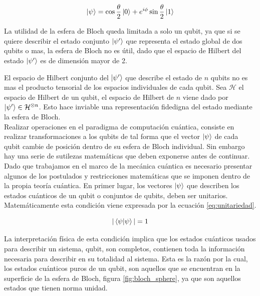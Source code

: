 \begin{equation}
    \ket{\psi} = \cos{\frac{\theta}{2}}\ket{0} + e^{i\phi}\sin{\frac{\theta}{2}}\ket{1}
    \label{eq:estado_bloch}
\end{equation}

La utilidad de la esfera de Bloch queda limitada a solo un qubit, ya que si se quiere describir el estado conjunto $\ket{\psi'}$ que representa el estado global de dos qubits o mas, la esfera de Bloch no es útil, dado que el espacio de Hilbert del estado $\ket{\psi'}$ es de dimensión mayor de 2. 

\newpage

El espacio de Hilbert conjunto del $\ket{\psi'}$ que describe el estado de $n$ qubits no es mas el producto tensorial de los espacios individuales de cada qubit. Sea $\mathcal{H}$ el espacio de Hilbert de un qubit, el espacio de Hilbert de $n$ viene dado por $\ket{\psi'} \in \mathcal{H}^{\otimes n}$. Esto hace inviable una representación fidedigna del estado mediante la esfera de Bloch.\\

Realizar operaciones en el paradigma de computación cuántica, consiste en realizar transformaciones a los qubits de tal forma que el vector $\ket{\psi}$ de cada qubit cambie de posición dentro de su esfera de Bloch individual. Sin embargo hay una serie de sutilezas matemáticas que deben exponerse antes de continuar. \\

Dado que trabajamos en el marco de la mecánica cuántica es necesario presentar algunos de los postulados y restricciones matemáticas que se imponen dentro de la propia teoría cuántica. En primer lugar, los vectores $\ket{\psi}$ que describen los estados cuánticos de un qubit o conjuntos de qubits, deben ser unitarios. Matemáticamente esta condición viene expresada por la ecuación \ref{eq:unitariedad}. 

\begin{equation}
    |\braket{{\psi}|{\psi}}| = 1
    \label{eq:unitariedad}
\end{equation}

La interpretación física de esta condición implica que los estados cuánticos usados para describir un sistema, qubit, son completos, contienen toda la información necesaria para describir en su totalidad al sistema. Esta es la razón por la cual, los estados cuánticos puros de un qubit, son aquellos que se encuentran en la superficie de la esfera de Bloch, figura \ref{fig:bloch_sphere}, ya que son aquellos estados que tienen norma unidad. \\

